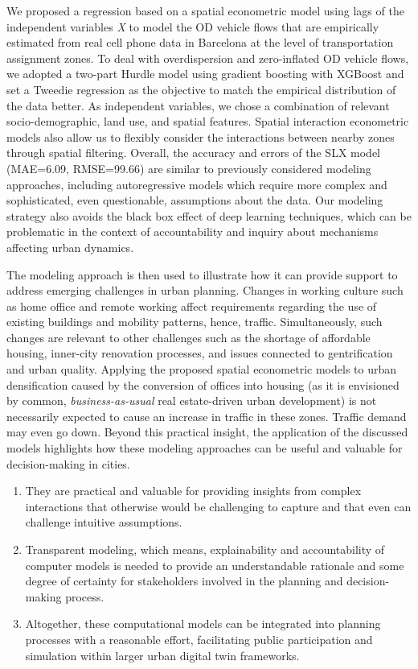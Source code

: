 We proposed a regression based on a spatial econometric model using lags of the independent variables \emph{X} to model the OD vehicle flows that are empirically estimated from real cell phone data in Barcelona at the level of transportation assignment zones. To deal with overdispersion and zero-inflated OD vehicle flows, we adopted a two-part Hurdle model using gradient boosting with XGBoost and set a Tweedie regression as the objective to match the empirical distribution of the data better. As independent variables, we chose a combination of relevant socio-demographic, land use, and spatial features. Spatial interaction econometric models also allow us to flexibly consider the interactions between nearby zones through spatial filtering. Overall, the accuracy and errors of the SLX model  (MAE=6.09, RMSE=99.66) are similar to previously considered modeling approaches, including autoregressive models which require more complex and sophisticated, even questionable, assumptions about the data. Our modeling strategy also avoids the black box effect of deep learning techniques, which can be problematic in the context of accountability and inquiry about mechanisms affecting urban dynamics.

The modeling approach is then used to illustrate how it can provide support to address emerging challenges in urban planning. Changes in working culture such as home office and remote working affect requirements regarding the use of existing buildings and mobility patterns, hence, traffic. Simultaneously, such changes are relevant to other challenges such as the shortage of affordable housing, inner-city renovation processes, and issues connected to gentrification and urban quality. 
Applying the proposed spatial econometric models to urban densification caused by the conversion of offices into housing (as it is envisioned by common, \emph{business-as-usual} real estate-driven urban development) is not necessarily expected to cause an increase in traffic in these zones. Traffic demand may even go down. Beyond this practical insight, the application of the discussed models highlights how these modeling approaches can be useful and valuable for decision-making in cities. 
\begin{enumerate}
    \item They are practical and valuable for providing insights from complex interactions that otherwise would be challenging to capture and that even can challenge intuitive assumptions. 
    \item Transparent modeling, which means, explainability and accountability of computer models is needed to provide an understandable rationale and some degree of certainty for stakeholders involved in the planning and decision-making process. 
    \item Altogether, these computational models can be integrated into planning processes with a reasonable effort, facilitating public participation and simulation within larger urban digital twin frameworks. 
\end{enumerate}

